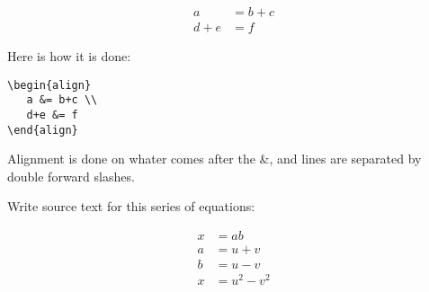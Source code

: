 \begin{align}
   a &= b+c \\
   d+e &= f
\end{align}

Here is how it is done:

\begin{verbatim}
\begin{align}
   a &= b+c \\
   d+e &= f
\end{align}
\end{verbatim}

Alignment is done on whater comes after the &, and lines are separated by double forward slashes.

 Write source text for this series of equations:

\begin{align}
x &= ab \\
a &= u + v \\
b &= u - v \\
x &= u^2 - v^2
\end{align}


